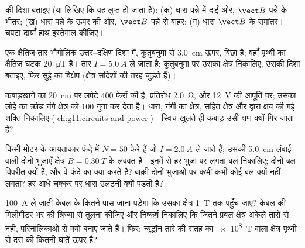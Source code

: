 \begin{exercise}[$\star\star$]\label{exo:g11:magnetic-fields:11}
 की दिशा बताइए (या लिखिए कि वह लुप्त हो जाता है):
(क) धारा पन्ने में दाईं ओर, $\vect B$ पन्ने के भीतर; (ख) धारा पन्ने के ऊपर की
ओर, $\vect B$ पन्ने से बाहर; (ग) धारा $\vect B$ के समांतर। चपटा दायाँ हाथ
इस्तेमाल कीजिए।
\end{exercise}

\begin{exercise}[$\star\star\star$]\label{exo:g11:magnetic-fields:12}
एक क्षैतिज तार भौगोलिक उत्तर--दक्षिण दिशा में, कुतुबनुमा से \qty{3.0}{cm} ऊपर, बिछा
है; वहाँ पृथ्वी का क्षैतिज घटक \qty{20}{\micro T} है। तार $I = \qty{5.0}{A}$ ले जाता है:
कुतुबनुमा पर उसका क्षेत्र निकालिए, उसकी दिशा बताइए, फिर सुई का
विक्षेप (क्षेत्र सदिशों की तरह जुड़ते हैं)।
\end{exercise}

\begin{exercise}[$\star\star\star$]\label{exo:g11:magnetic-fields:13}
कबाड़खाने का  \qty{20}{cm} पर लपेटे $400$ फेरों की
 है, प्रतिरोध \qty{2.0}{\ohm}, और \qty{12}{V} की आपूर्ति पर; उसका
लोहे का क्रोड नंगे क्षेत्र को $100$ गुना कर देता है। धारा,
नंगी  का क्षेत्र,  सहित क्षेत्र और
 द्वारा क्षय की गई शक्ति निकालिए (\cref{ch:g11:circuits-and-power})। स्विच
खुलते ही कबाड़ उसी क्षण क्यों गिर जाता है?
\end{exercise}

\begin{exercise}[$\star\star\star$]\label{exo:g11:magnetic-fields:14}
किसी मोटर के आयताकार फंदे में $N = 50$ फेरे हैं जो $I = \qty{2.0}{A}$ ले जाते हैं; उसकी
\qty{5.0}{cm} लंबाई वाली दोनों भुजाएँ क्षेत्र $B = \qty{0.30}{T}$ के लंबवत हैं। इनमें
से हर भुजा पर लगता बल निकालिए; दोनों बल विपरीत क्यों हैं,
और वे फंदे का क्या करते हैं? बाक़ी दोनों भुजाओं पर कभी-कभी कोई बल
क्यों नहीं लगता? हर आधे चक्कर पर धारा उलटनी क्यों पड़ती है?
\end{exercise}

\begin{exercise}[$\star\star\star$]\label{exo:g11:magnetic-fields:15}
\qty{100}{A} ले जाती केबल के कितने पास जाना पड़ेगा कि उसका क्षेत्र
\qty{1}{T} तक पहुँच जाए? केबल की मिलीमीटर भर की त्रिज्या से तुलना कीजिए और
निष्कर्ष निकालिए कि  जितने प्रबल क्षेत्र अकेले तारों से नहीं,
परिनालिकाओं से क्यों बनाए जाते हैं। फिर: न्यूट्रॉन तारे की सतह का
\qty{e8}{T} वाला क्षेत्र पृथ्वी से दस की कितनी घातें ऊपर है?
\end{exercise}

